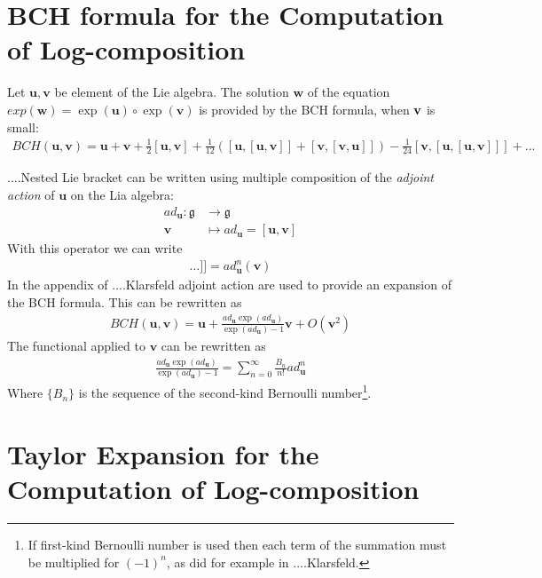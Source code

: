 \section{BCH formula for the Computation of Log-composition}



Let $\mathbf{u},\mathbf{v}$ be element of the Lie algebra. The solution $\mathbf{w}$ of the equation $exp(\mathbf{w}) = \exp(\mathbf{u}) \circ \exp(\mathbf{v})$ is provided by the BCH formula, when $\bf{v}$ is small:
\begin{align*}
BCH(\mathbf{u},\mathbf{v}) 
= 
\mathbf{u} + \mathbf{v} + \frac{1}{2}[\mathbf{u},\mathbf{v}] + \frac{1}{12}([\mathbf{u},[\mathbf{u},\mathbf{v}]]
+ [\mathbf{v},[\mathbf{v},\mathbf{u}]]) - \frac{1}{24}[\mathbf{v},[\mathbf{u},[\mathbf{u},\mathbf{v}]]] +... 
\end{align*}

....Nested Lie bracket can be written using multiple composition of the \emph{adjoint action} of $\mathbf{u}$ on the Lia algebra:
\begin{align*}
ad_{\mathbf{u}} : \mathfrak{g}  & \longrightarrow \mathfrak{g}  
\\
\mathbf{v} &\longmapsto ad_{\mathbf{u}}   =  [\mathbf{u}, \mathbf{v}]
\end{align*}
With this operator we can write 
\begin{align*}
[  \underbrace{   \mathbf{u},[\mathbf{u},... [\mathbf{u}}_{\text{n-times}},\mathbf{v}]...]] =  ad_{\mathbf{u}}^{n}(\mathbf{v})
\end{align*}
In the appendix of ....Klarsfeld adjoint action are used to provide an expansion of the BCH formula. This can be rewritten as
\begin{align*}
BCH(\mathbf{u},\mathbf{v})  = \mathbf{u} + \frac{ ad_{\mathbf{u}} \exp(ad_{\mathbf{u}}) }{ \exp(ad_{\mathbf{u}}) - 1 }  \mathbf{v} + O({\mathbf{v}}^2)
\end{align*}
The functional applied to $\mathbf{v}$ can be rewritten as
\begin{align*}
\frac{ ad_{\mathbf{u}} \exp(ad_{\mathbf{u}}) }{ \exp(ad_{\mathbf{u}}) - 1 }  = \sum_{n=0}^{\infty} \frac{B_{n}}{n!} ad_{\mathbf{u}}^{n} 
\end{align*}
Where $\lbrace B_{n} \rbrace $ is the sequence of the second-kind Bernoulli number\footnote{If first-kind Bernoulli number is used then each term of the summation must be multiplied for $(-1)^{n}$, as did for example in ....Klarsfeld.}.

\section{Taylor Expansion for the Computation of Log-composition}


